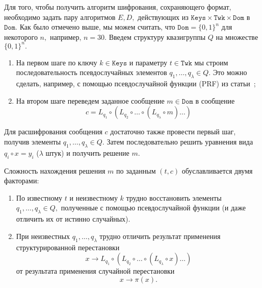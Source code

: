     Для того, чтобы получить алгоритм шифрования, сохраняющего формат, необходимо задать пару алгоритмов $E, D,$ действующих из $\texttt{Keys} \times \texttt{Twk} \times \texttt{Dom}$ в $\texttt{Dom}.$
    Как было отмечено выше, мы можем считать, что $\texttt{Dom} = \{0, 1\}^n$ для некоторого $n,$ например, $n = 30.$
    Введем структуру квазигруппы $Q$ на множестве $\{0, 1\}^n.$

    \begin{enumerate}
        \item На первом шаге по ключу $k \in \texttt{Keys}$ и параметру $t \in \texttt{Twk}$ мы строим последовательность псевдослучайных элементов $q_1, \ldots, q_{\lambda} \in Q.$
        Это можно сделать, например, с помощью псевдослучайной функции (PRF) из статьи~\cite{alekseev16};

        \item На втором шаге переведем заданное сообщение $m \in \texttt{Dom}$ в сообщение
        \[
            c = L_{q_1} \circ (L_{q_2} \circ \ldots \circ (L_{q_{\lambda}} \circ m) \ldots )
        \]
    \end{enumerate}

    Для расшифрования сообщения $c$ достаточно также провести первый шаг, получив элементы $q_1, \ldots, q_{\lambda} \in Q.$
    Затем последовательно решить уравнения вида $q_i \circ x = y_i$ ($\lambda$ штук) и получить решение $m.$

    Сложность нахождения решения $m$ по заданным $(t, c)$ обуславливается двумя факторами:
    \begin{enumerate}
        \item По известному $t$ и неизвестному $k$ трудно восстановить элементы $q_1, \ldots, q_{\lambda} \in Q,$ полученные с помощью псевдослучайной функции (и даже отличить их от истинно случайных).

        \item При неизвестных $q_1, \ldots, q_{\lambda}$ трудно отличить результат применения структурированной перестановки 
        \[
            x \to L_{q_1} \circ (L_{q_2} \circ \ldots \circ (L_{q_{\lambda}} \circ x) \ldots )
        \]
        от результата применения случайной перестановки
        \[
            x \to \pi(x).
        \]
    \end{enumerate}

